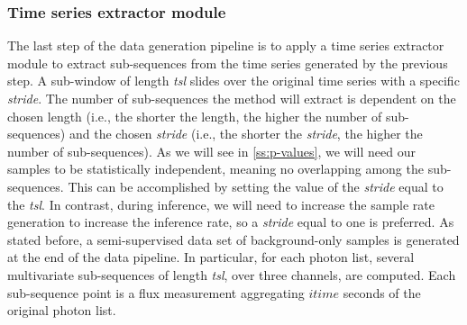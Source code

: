 \subsubsection{Time series extractor module}
\label{ss:extractor}
The last step of the data generation pipeline is to apply a time series extractor module to extract sub-sequences from the time series generated by the previous step. A sub-window of length \textit{tsl} slides over the original time series with a specific \textit{stride}. The number of sub-sequences the method will extract is dependent on the chosen length (i.e., the shorter the length, the higher the number of sub-sequences) and the chosen \textit{stride} (i.e., the shorter the \textit{stride}, the higher the number of sub-sequences). As we will see in \autoref{ss:p-values}, we will need our samples to be statistically independent, meaning no overlapping among the sub-sequences. This can be accomplished by setting the value of the \textit{stride} equal to the \textit{tsl}. In contrast, during inference, we will need to increase the sample rate generation to increase the inference rate, so a \textit{stride} equal to one is preferred. As stated before, a semi-supervised data set of background-only samples is generated at the end of the data pipeline. In particular, for each photon list, several multivariate sub-sequences of length \textit{tsl}, over three channels, are computed. Each sub-sequence point is a flux measurement aggregating $itime$ seconds of the original photon list.

